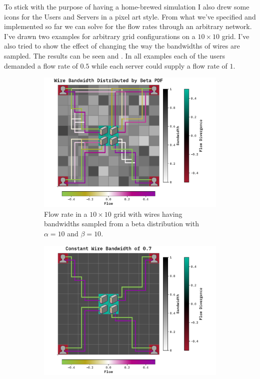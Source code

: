 \documentclass[10pt, titlepage, a4paper]{article}
\begin{document}
To stick with the purpose of having a home-brewed simulation I also drew some icons for the Users and Servers in a pixel 
art style. From what we've specified and implemented so far we can solve for the flow rates through an arbitrary
network. I've drawn two examples for arbitrary grid configurations on a $10\times 10$ grid. I've also tried to show the effect 
of changing the way the bandwidths of wires are sampled. The results can be seen \textcolor{red}{} and 
\textcolor{red}{}. In all examples each of the users demanded a flow rate of 
$0.5$ while each server could supply a flow rate of $1$. 

\begin{figure}[H]
    \centering
    \begin{subfigure}[t]{0.45\textwidth}
        \includegraphics[width=\textwidth]{../Images/arbitrary-1-beta.pdf}
        \caption{Flow rate in a $10\times 10$ grid with wires having bandwidths sampled from a beta distribution with $\alpha = 10$ and $\beta = 10$.}
        \label{fig:ar1-beta}
    \end{subfigure}\hspace{1.0cm}
    \begin{subfigure}[t]{0.45\textwidth}
        \includegraphics[width=\textwidth]{../Images/arbitrary-1-constant.pdf}

\end{subfigure}
\end{figure}
\end{document}
